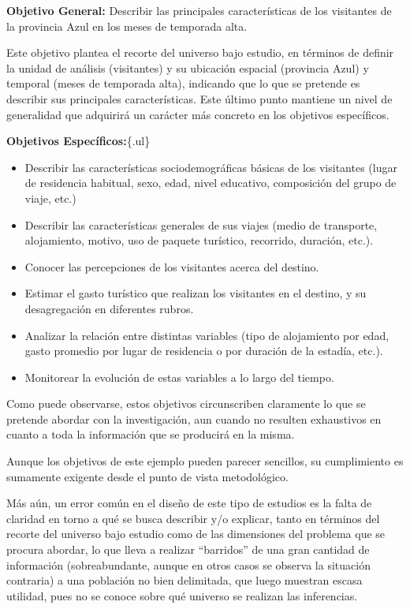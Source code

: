 \documentclass[
]{book}
\begin{document}
\textbf{Objetivo General:} Describir las principales características de los visitantes de la provincia Azul en los meses de temporada alta.

Este objetivo plantea el recorte del universo bajo estudio, en términos de definir la unidad de análisis (visitantes) y su ubicación espacial (provincia Azul) y temporal (meses de temporada alta), indicando que lo que se pretende es describir sus principales características. Este último punto mantiene un nivel de generalidad que adquirirá un carácter más concreto en los objetivos específicos.

\textbf{Objetivos Específicos:}\{.ul\}

\begin{itemize}
\item
  Describir las características sociodemográficas básicas de los visitantes (lugar de residencia habitual, sexo, edad, nivel educativo, composición del grupo de viaje, etc.)
\item
  Describir las características generales de sus viajes (medio de transporte, alojamiento, motivo, uso de paquete turístico, recorrido, duración, etc.).
\item
  Conocer las percepciones de los visitantes acerca del destino.
\item
  Estimar el gasto turístico que realizan los visitantes en el destino, y su desagregación en diferentes rubros.
\item
  Analizar la relación entre distintas variables (tipo de alojamiento por edad, gasto promedio por lugar de residencia o por duración de la estadía, etc.).
\item
  Monitorear la evolución de estas variables a lo largo del tiempo.
\end{itemize}

Como puede observarse, estos objetivos circunscriben claramente lo que se pretende abordar con la investigación, aun cuando no resulten exhaustivos en cuanto a toda la información que se producirá en la misma.

Aunque los objetivos de este ejemplo pueden parecer sencillos, su cumplimiento es sumamente exigente desde el punto de vista metodológico.

Más aún, un error común en el diseño de este tipo de estudios es la falta de claridad en torno a qué se busca describir y/o explicar, tanto en términos del recorte del universo bajo estudio como de las dimensiones del problema que se procura abordar, lo que lleva a realizar ``barridos'' de una gran cantidad de información (sobreabundante, aunque en otros casos se observa la situación contraria) a una población no bien delimitada, que luego muestran escasa utilidad, pues no se conoce sobre qué universo se realizan las inferencias.
\end{document}
